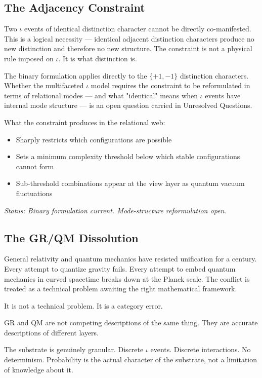 \documentclass[11pt,letterpaper]{article}
\begin{document}
\subsection{The Adjacency Constraint}
\label{sec:orgf30732d}

Two \(\iota\) events of identical distinction character cannot be directly co-manifested. This is a logical necessity --- identical adjacent distinction characters produce no new distinction and therefore no new structure. The constraint is not a physical rule imposed on \(\iota\). It is what distinction is.

The binary formulation applies directly to the \(\{+1,-1\}\) distinction characters. Whether the multifaceted \(\iota\) model requires the constraint to be reformulated in terms of relational modes --- and what "identical" means when \(\iota\) events have internal mode structure --- is an open question carried in Unresolved Questions.

What the constraint produces in the relational web:
\begin{itemize}
\item Sharply restricts which configurations are possible
\item Sets a minimum complexity threshold below which stable configurations cannot form
\item Sub-threshold combinations appear at the view layer as quantum vacuum fluctuations
\end{itemize}

\emph{Status: Binary formulation current. Mode-structure reformulation open.}

\subsection{The GR/QM Dissolution}
\label{sec:orga3e3c1f}

General relativity and quantum mechanics have resisted unification for a century. Every attempt to quantize gravity fails. Every attempt to embed quantum mechanics in curved spacetime breaks down at the Planck scale. The conflict is treated as a technical problem awaiting the right mathematical framework.

It is not a technical problem. It is a category error.

GR and QM are not competing descriptions of the same thing. They are accurate descriptions of different layers.

The substrate is genuinely granular. Discrete \(\iota\) events. Discrete interactions. No determinism. Probability is the actual character of the substrate, not a limitation of knowledge about it.
\end{document}
